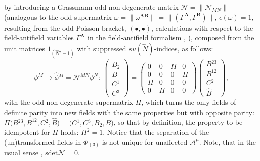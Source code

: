 \documentclass[10pt]{article}
\begin{document}
 by introducing a Grassmann-odd non-degenerate matrix
$\mathcal{N}=\|\mathcal{N}_{MN}\|$ (analogous to the odd supermatrix
$\omega = \|\omega^{\mathbf{AB}}\|$ = $\|(\Gamma^{\mathbf{A}},\Gamma^{\mathbf{B}})\| $,
$\epsilon(\omega)=1$, resulting from the odd Poisson bracket, $ (\bullet,\bullet)$,   calculations
with respect to the field-antifield variables $\Gamma^\mathbf{A}$ in the field-antifield
formalism \cite{bv}, \cite{ht}), composed from the unit matrices $1_{(\hat{N}{}^2-1)}$ with suppressed $su(\hat{N})$-indices,
  as follows:
\begin{equation}\label{calN}
  \phi^M \to \widehat{\phi}{}^M = \mathcal{N}^{MN}\phi^N : \  \left(\begin{array}{c}
    \overline{B}{}_2 \\
     {B} \\
     \overline{C}{}^{1}\\
     \overline{C}{}^{3}
  \end{array}\right)= \left(\begin{array}{cccc}
                              0 & 0 & \Pi & 0 \\
                              0 & 0 & 0 & \Pi\\
                              \Pi & 0 & 0 & 0 \\
                              0 & \Pi & 0 & 0
                            \end{array}
  \right) \left(\begin{array}{c}
    {B}{}^{23} \\
     {B}^{12} \\
     {C}{}^{2}\\
      \widehat{B}{}
  \end{array}\right),
\end{equation}
with the  odd non-degenerate supermatrix $\Pi$, which turns the only fields of definite parity into new fields with the same properties but with opposite parity:
$\Pi \big({B}{}^{23},   {B}^{12},   {C}{}^{2},  \widehat{B}\big)  = \big(  \overline{C}{}^{1},     \overline{C}{}^{3},   \overline{B}{}_2,  {B}\big)$,
  so that by definition,
the  property  to be idempotent for $\Pi$ holds: $\Pi^2=1$.
Notice that the separation of the (un)transformed fields in ${\Phi}_{(3)}$ is not unique
for unaffected $\mathcal{A}^\mu$. Note, that in the usual sense \cite{berezin}, \cite{books3}  $\mathrm{sdet} \mathcal{N}=0$.
\end{document}
